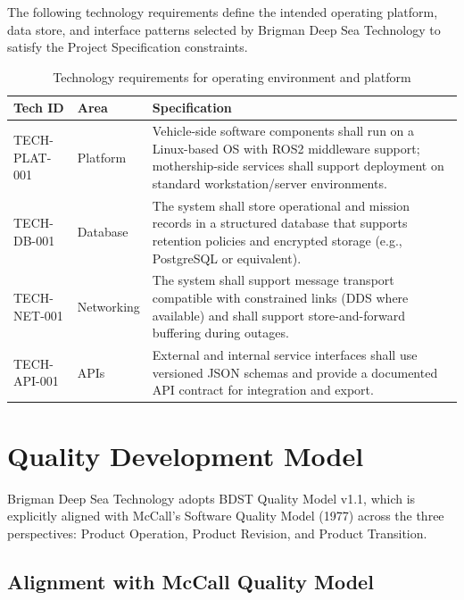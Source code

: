 \documentclass[11pt,a4paper]{article}
\begin{document}
The following technology requirements define the intended operating platform, data store, and interface patterns selected by Brigman Deep Sea Technology to satisfy the Project Specification constraints.

\begin{table}[H]
\centering
\small
\renewcommand{\arraystretch}{1.2}
\begin{tabular}{|p{}|p{}|p{}|}
\hline
\rowcolor{tableheader}
\textbf{Tech ID} & \textbf{Area} & \textbf{Specification} \\
\hline
TECH-PLAT-001 & Platform & Vehicle-side software components shall run on a Linux-based OS with ROS2 middleware support; mothership-side services shall support deployment on standard workstation/server environments. \\
\hline
TECH-DB-001 & Database & The system shall store operational and mission records in a structured database that supports retention policies and encrypted storage (e.g., PostgreSQL or equivalent). \\
\hline
TECH-NET-001 & Networking & The system shall support message transport compatible with constrained links (DDS where available) and shall support store-and-forward buffering during outages. \\
\hline
TECH-API-001 & APIs & External and internal service interfaces shall use versioned JSON schemas and provide a documented API contract for integration and export. \\
\hline
\end{tabular}
\caption{Technology requirements for operating environment and platform}
\label{tab:tech-requirements}
\end{table}

\section{Quality Development Model}
\label{sec:quality-model}

Brigman Deep Sea Technology adopts BDST Quality Model v1.1, which is
explicitly aligned with McCall’s Software Quality Model (1977) across
the three perspectives: Product Operation, Product Revision, and Product Transition.

\subsection{Alignment with McCall Quality Model}
\end{document}
